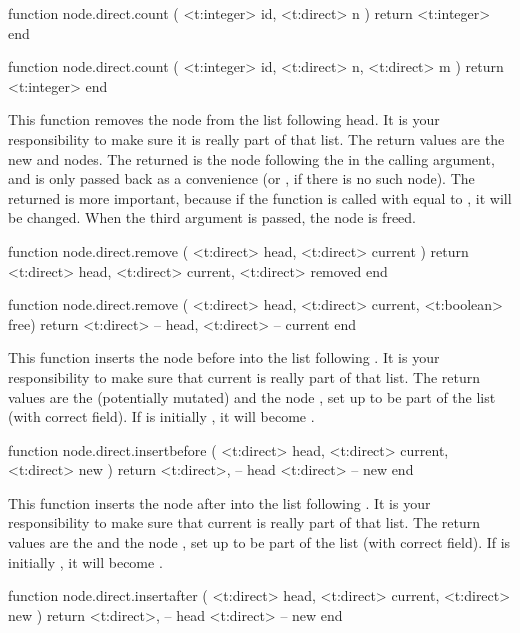 \starttyping[option=LUA]
function node.direct.count (
    <t:integer> id,
    <t:direct>  n
)
    return <t:integer>
end

function node.direct.count (
    <t:integer> id,
    <t:direct>  n,
    <t:direct>  m
)
    return <t:integer>
end
\stoptyping

This function removes the node  from the list following \type
{head}. It is your responsibility to make sure it is really part of that list.
The return values are the new  and  nodes. The
returned  is the node following the  in the calling
argument, and is only passed back as a convenience (or , if there is
no such node). The returned  is more important, because if the
function is called with  equal to , it will be
changed. When the third argument is passed, the node is freed.

\starttyping[option=LUA]
function node.direct.remove ( <t:direct> head, <t:direct> current )
    return
        <t:direct> head,
        <t:direct> current,
        <t:direct> removed
end

function node.direct.remove ( <t:direct> head, <t:direct> current, <t:boolean> free)
    return
        <t:direct> -- head,
        <t:direct> -- current
end
\stoptyping

This function inserts the node  before  into the list
following . It is your responsibility to make sure that \type
{current} is really part of that list. The return values are the (potentially
mutated)  and the node , set up to be part of the list
(with correct  field). If  is initially , it
will become .

\starttyping[option=LUA]
function node.direct.insertbefore (
    <t:direct> head,
    <t:direct> current,
    <t:direct> new
)
    return
        <t:direct>, -- head
        <t:direct>  -- new
end
\stoptyping

This function inserts the node  after  into the list
following . It is your responsibility to make sure that \type
{current} is really part of that list. The return values are the  and
the node , set up to be part of the list (with correct 
field). If  is initially , it will become .

\starttyping[option=LUA]
function node.direct.insertafter (
    <t:direct> head,
    <t:direct> current,
    <t:direct> new
)
    return
        <t:direct>, -- head
        <t:direct>  -- new
end
\stoptyping

